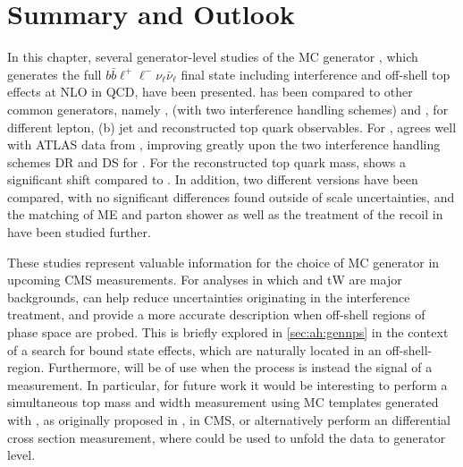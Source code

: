\section{Summary and Outlook}

In this chapter, several generator-level studies of the MC generator \bbfourl, which generates the full $b \bar{b} \ell^+ \ell^- \nu_{\ell} \bar{\nu}_{\ell}$ final state including \tttW interference and off-shell top effects at NLO in QCD, have been presented. \bbfourl has been compared to other common \ttbar generators, namely \hvq, \ST (with two interference handling schemes) and \ttb, for different lepton, (b) jet and reconstructed top quark observables. For \mblminimax, \bbfourl agrees well with ATLAS data from , improving greatly upon the two interference handling schemes DR and DS for \tttWsum. For the reconstructed top quark mass, \bbfourl shows a significant shift compared to \tttWsum. In addition, two different \bbfourl versions have been compared, with no significant differences found outside of scale uncertainties, and the matching of ME and parton shower as well as the treatment of the recoil in \bbfourl have been studied further.

These studies represent valuable information for the choice of \ttbar MC generator in upcoming CMS measurements. For analyses in which \ttbar and tW are major backgrounds, \bbfourl can help reduce uncertainties originating in the \tttW interference treatment, and provide a more accurate description when off-shell regions of phase space are probed. This is briefly explored in \cref{sec:ah:gennps} in the context of a search for \ttbar bound state effects, which are naturally located in an off-shell-region. Furthermore, \bbfourl will be of use when the \pptt process is instead the signal of a measurement. In particular, for future work it would be interesting to perform a simultaneous top mass and width measurement using MC templates generated with \bbfourl, as originally proposed in , in CMS, or alternatively perform an differential \tttWsum cross section measurement, where \bbfourl could be used to unfold the data to generator level. 
